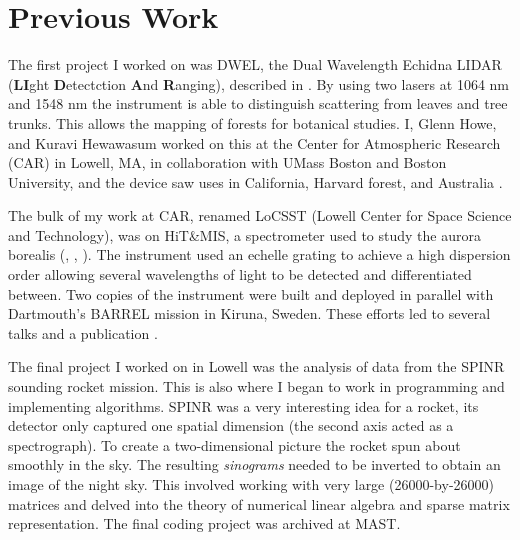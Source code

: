 \documentclass{article}
\begin{document}
    \section{Previous Work}
        The first project I worked on was DWEL, the
        Dual Wavelength Echidna LIDAR
        (\textbf{LI}ght \textbf{D}etectction \textbf{A}nd \textbf{R}anging),
        described in \cite{DWEL2012}.
        By using two lasers at 1064 nm and 1548 nm the instrument is able
        to distinguish scattering from leaves and tree trunks. This allows
        the mapping of forests for botanical studies. I, Glenn Howe, and
        Kuravi Hewawasum worked on this at the Center for Atmospheric
        Research (CAR) in Lowell, MA, in collaboration with UMass Boston
        and Boston University, and the device saw uses in California,
        Harvard forest, and Australia
        \cite{Li2016RadiometricCO}.
        \par\hfill\par
        The bulk of my work at CAR, renamed LoCSST
        (Lowell Center for Space Science and Technology), was on
        HiT\&MIS, a spectrometer used to study the aurora borealis
        (\cite{2011AGUFMSA13B1890C}, \cite{2014AGUFMSA13B4000H},
        \cite{2015AGUFMSA13B2369A}). The
        instrument used an echelle grating to achieve a high dispersion
        order allowing several wavelengths of light to be detected and
        differentiated between. Two copies of the instrument were built
        and deployed in parallel with Dartmouth's BARREL mission in
        Kiruna, Sweden. These efforts led to several talks and a
        publication \cite{AryalHewawasamMaguire2018DerivationHitAndMIS}.
        \par\hfill\par
        The final project I worked on in Lowell was the analysis of data
        from the SPINR sounding rocket mission. This is also where I began
        to work in programming and implementing algorithms. SPINR was a very
        interesting idea for a rocket, its detector only captured one
        spatial dimension (the second axis acted as a spectrograph). To
        create a two-dimensional picture the rocket spun about smoothly
        in the sky. The resulting \textit{sinograms} needed to be inverted
        to obtain an image of the night sky. This involved working with
        very large (26000-by-26000) matrices and delved into the theory of
        numerical linear algebra and sparse matrix representation. The
        final coding project was archived at MAST.
\end{document}
